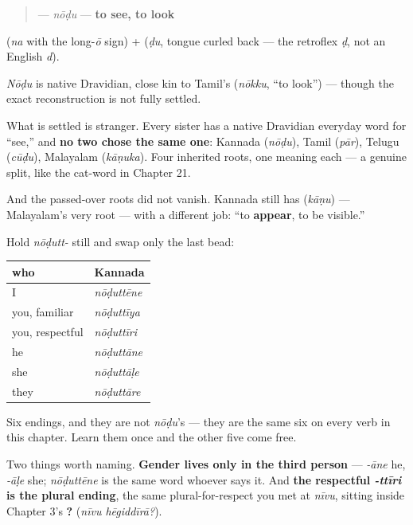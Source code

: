 \begin{cousinweb}
\begin{quote}
\textbf{} — \emph{nōḍu} — \textbf{to see, to look}
\end{quote}

\textbf{} (\emph{na} with the long-\emph{ō} sign) + \textbf{} (\emph{ḍu}, tongue curled back — the retroflex \emph{ḍ}, not an English \emph{d}).

\emph{Nōḍu} is native Dravidian, close kin to Tamil's \textbf{} (\emph{nōkku}, \textquotedblleft{}to look\textquotedblright{}) — though the exact reconstruction is not fully settled.

What is settled is stranger. Every sister has a native Dravidian everyday word for \textquotedblleft{}see,\textquotedblright{} and \textbf{no two chose the same one}: Kannada \textbf{} (\emph{nōḍu}), Tamil \textbf{} (\emph{pār}), Telugu \textbf{} (\emph{cūḍu}), Malayalam \textbf{} (\emph{kāṇuka}). Four inherited roots, one meaning each — a genuine split, like the cat-word in Chapter 21.

And the passed-over roots did not vanish. Kannada still has \textbf{} (\emph{kāṇu}) — Malayalam's very root — with a different job: \textquotedblleft{}to \textbf{appear}, to be visible.\textquotedblright{}
\end{cousinweb}

\begin{grammarlens}[title={Grammar Lens: the third slot, and where gender lives}]
Hold \emph{nōḍutt-} still and swap only the last bead:

\noindent
\begin{tabularx}{\linewidth}{@{}>{\raggedright\arraybackslash}X>{\raggedright\arraybackslash}X@{}}
\toprule
\textbf{who} & \textbf{Kannada} \\
\midrule
I & \emph{nōḍuttēne} \\
you, familiar & \emph{nōḍuttīya} \\
you, respectful & \emph{nōḍuttīri} \\
he & \emph{nōḍuttāne} \\
she & \emph{nōḍuttāḷe} \\
they & \emph{nōḍuttāre} \\
\bottomrule
\end{tabularx}

Six endings, and they are not \emph{nōḍu}'s — they are the same six on every verb in this chapter. Learn them once and the other five come free.

Two things worth naming. \textbf{Gender lives only in the third person} — \emph{-āne} he, \emph{-āḷe} she; \emph{nōḍuttēne} is the same word whoever says it. And \textbf{the respectful \emph{-ttīri} is the plural ending}, the same plural-for-respect you met at \emph{nīvu}, sitting inside Chapter 3's \textbf{ ?} (\emph{nīvu hēgiddīrā?}).
\end{grammarlens}

